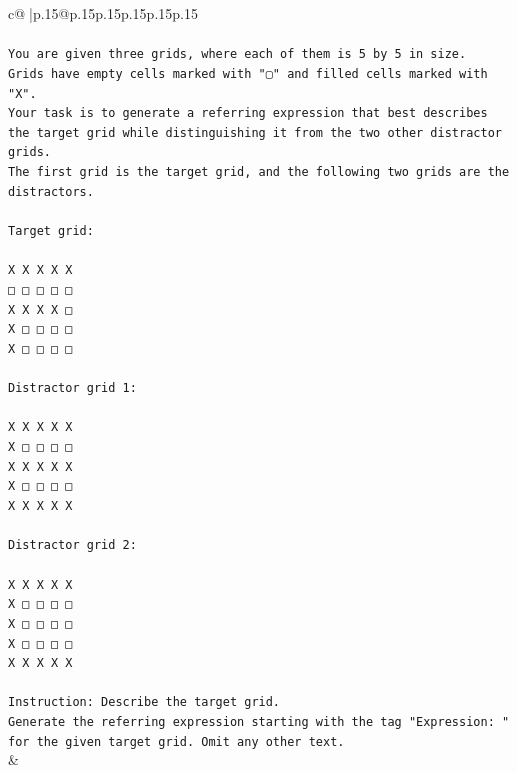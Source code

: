 \documentclass{article}
\begin{document}
{\begin{supertabular}{c@{$\;$}|p{.15\linewidth}@{}p{.15\linewidth}p{.15\linewidth}p{.15\linewidth}p{.15\linewidth}p{.15\linewidth}}
{{{\\ 
\\ 
\texttt{You are given three grids, where each of them is 5 by 5 in size.} \\
\texttt{Grids have empty cells marked with "▢" and filled cells marked with "X".} \\
\texttt{Your task is to generate a referring expression that best describes the target grid while distinguishing it from the two other distractor grids.} \\
\texttt{The first grid is the target grid, and the following two grids are the distractors.} \\
\\ 
\texttt{Target grid:} \\
\\ 
\texttt{X X X X X} \\
\texttt{□ □ □ □ □} \\
\texttt{X X X X □} \\
\texttt{X □ □ □ □} \\
\texttt{X □ □ □ □} \\
\\ 
\texttt{Distractor grid 1:} \\
\\ 
\texttt{X X X X X} \\
\texttt{X □ □ □ □} \\
\texttt{X X X X X} \\
\texttt{X □ □ □ □} \\
\texttt{X X X X X} \\
\\ 
\texttt{Distractor grid 2:} \\
\\ 
\texttt{X X X X X} \\
\texttt{X □ □ □ □} \\
\texttt{X □ □ □ □} \\
\texttt{X □ □ □ □} \\
\texttt{X X X X X} \\
\\ 
\texttt{Instruction: Describe the target grid.} \\
\texttt{Generate the referring expression starting with the tag "Expression: " for the given target grid. Omit any other text.} \\
            }
        }
    }
    & \\ \\


\end{supertabular}}
\end{document}
